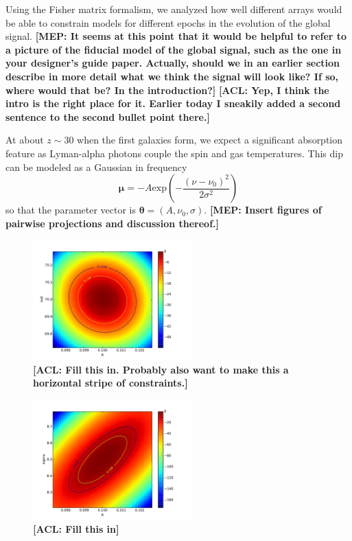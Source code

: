 \documentclass[twolcolumn,apj]{emulateapj}
\newcommand{\acl}[1]{{\color{red} \textbf{[ACL:  #1]}}}
\newcommand{\mep}[1]{{\color{applegreen} \textbf{[MEP:  #1]}}}
\begin{document}
Using the Fisher matrix formalism, we analyzed how well different arrays would be able to constrain models for different epochs in the evolution of the global signal. \mep{It seems at this point that it would be helpful to refer to a picture of the fiducial model of the global signal, such as the one in your designer's guide paper. Actually, should we in an earlier section describe in more detail what we think the signal will look like? If so, where would that be? In the introduction?} \acl{Yep, I think the intro is the right place for it.  Earlier today I sneakily added a second sentence to the second bullet point there.}

At about $z\sim 30$ when the first galaxies form, we expect a significant absorption feature as Lyman-alpha photons couple the spin and gas temperatures. This dip can be modeled as a Gaussian in frequency
\begin{equation}
\boldsymbol \mu = -A\textrm{exp}\left ( -\frac{(\nu - \nu_0)^2}{2\sigma^2} \right ) 
\end{equation}
so that the parameter vector is $\boldsymbol \theta = (A,\nu_0,\sigma)$. \mep{Insert figures of pairwise projections and discussion thereof.} 

\begin{figure}[h]
	\centering
	\includegraphics[width=0.55\textwidth]{figures/contours_A_nu0.pdf}
	\caption{\acl{Fill this in.  Probably also want to make this a horizontal stripe of constraints.}}
\end{figure}

\begin{figure}[h]
	\centering
	\includegraphics[width=0.55\textwidth]{figures/contours_A_sigma.pdf}
	\caption{\acl{Fill this in}}
\end{figure}
\end{document}
